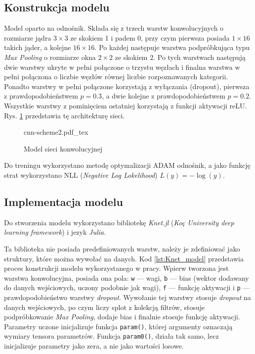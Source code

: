 \documentclass[pl,12pt]{aghdpl}
\let\Oldsubsection\subsection%
\renewcommand{\subsection}{\FloatBarrier\Oldsubsection}
\begin{document}
\subsection{Konstrukcja modelu}
Model oparto na {\color{red}odnośnik}. Składa się z trzech warstw
konwolucyjnych o rozmiarze jądra $3 \times 3$ ze skokiem 1 i padem 0, przy czym
pierwsza posiada $1 \times 16$ takich jąder, a kolejne $16\times 16$. Po każdej
następuje warstwa podpróbkująca typu \textit{Max Pooling} o rozmiarze okna $2
\times 2$ ze skokiem $2$. Po tych warstwach następują dwie warstwy ukryte w
pełni połączone o trzystu węzłach i finalna warstwa w pełni połączona o liczbie
węzłów równej liczbie rozpoznawanych kategorii.  Ponadto warstwy w pełni
połączone korzystają z wyłączania (dropout), pierwsza z prawdopodobieństwem $p
= 0.3$, a dwie kolejne z prawdopodobieństwem $p = 0.2$.  Wszystkie warstwy z
pominięciem ostatniej korzystają z funkcji aktywacji reLU.  Rys.
\ref{fig:cnn_scheme} przedstawia tę architekturę sieci.
\begin{figure}[!tbh]
  \centering
  \scriptsize{cnn-scheme2.pdf_tex}
  \caption{Model sieci konwolucyjnej}
  \label{fig:cnn_scheme}
\end{figure}

Do treningu wykorzystano metodę optymalizacji ADAM {\color{red}odnośnik}, a
jako funkcję strat wykorzystano NLL (\textit{Negative Log Lokelihood}) $L(y) =
-\log(y)$.
\subsection{Implementacja modelu}
Do stworzenia modelu wykorzystano bibliotekę \textit{Knet.jl} (\textit{Koç
University deep learning framework}) i jezyk \textit{Julia}.

Ta biblioteka nie posiada predefiniowanych warstw, należy je zdefiniować
jako struktury, które można wywołać na danych. Kod \ref{lst:Knet_model}
przedstawia proces konstrukcji modelu wykorzystanego w pracy. Wpierw tworzona
jest warstwa konwolucyjna, posiada ona pola: \lstinline|w| --- wagi,
\lstinline|b| --- bias (wektor dodawany do danych wejściowych, uczony podobnie
jak wagi), \lstinline|f| --- funkcję aktywacji i \lstinline|p| ---
prawdopodobieństwo warstwy \textit{dropout}. Wywołanie tej warstwy stosuje
\textit{dropout} na danych wejściowych, po czym liczy splot z kolekcją filtrów,
stosuje podpróbkowanie \textit{Max Pooling}, dodaje bias i finalnie stosuje
funkcję aktywacji. Parametry uczone inicjalizuje funkcja \lstinline|param()|,
której argumenty oznaczają wymiary tensora parametrów. Funkcja
\lstinline|param0()|, działa tak samo, lecz inicjalizuje parametry jako zera, a
nie jako wartości losowe.
\end{document}

